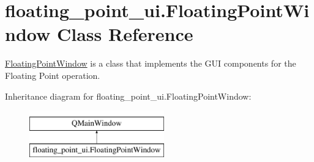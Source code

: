 \hypertarget{classfloating__point__ui_1_1_floating_point_window}{}\section{floating\+\_\+point\+\_\+ui.\+Floating\+Point\+Window Class Reference}
\label{classfloating__point__ui_1_1_floating_point_window}


\hyperlink{classfloating__point__ui_1_1_floating_point_window}{Floating\+Point\+Window} is a class that implements the G\+UI components for the Floating Point operation.  


Inheritance diagram for floating\+\_\+point\+\_\+ui.\+Floating\+Point\+Window\+:\begin{figure}[H]
\begin{center}
\leavevmode
\includegraphics[height=2.000000cm]{classfloating__point__ui_1_1_floating_point_window}
\end{center}
\end{figure}
